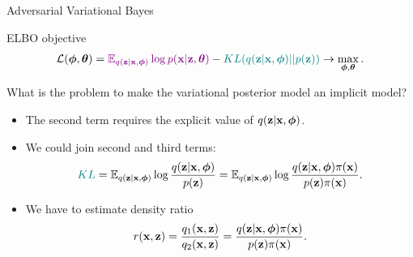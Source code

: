 \documentclass{beamer}
\begin{document}
\begin{frame}{Adversarial Variational Bayes}
	\begin{block}{ELBO objective}
		\vspace{-0.5cm}
		\[
			\mathcal{L} (\boldsymbol{\phi}, \boldsymbol{\theta})  = {\color{violet}\mathbb{E}_{q(\mathbf{z} | \mathbf{x}, \boldsymbol{\phi})} \log p(\mathbf{x} | \mathbf{z}, \boldsymbol{\theta})} - {\color{teal}KL(q(\mathbf{z}| \mathbf{x}, \boldsymbol{\phi}) || p(\mathbf{z}))} \rightarrow \max_{\boldsymbol{\phi}, \boldsymbol{\theta}}.
		\]	
		\vspace{-0.5cm}
	\end{block}
	What is the problem to make the variational posterior model an implicit model?
	\begin{itemize}
	\item {\color{teal}The second term} requires the explicit value of $q(\mathbf{z} | \mathbf{x}, \boldsymbol{\phi})$.
	\item We could join second and third terms:
		\vspace{-0.2cm}
		{\small
		\[
			{\color{teal}KL} = \mathbb{E}_{q(\mathbf{z} | \mathbf{x}, \boldsymbol{\phi})} \log \frac{q(\mathbf{z}| \mathbf{x}, \boldsymbol{\phi})}{p(\mathbf{z})} = \mathbb{E}_{q(\mathbf{z} | \mathbf{x}, \boldsymbol{\phi})} \log \frac{q(\mathbf{z}| \mathbf{x}, \boldsymbol{\phi}) \pi (\mathbf{x})}{p(\mathbf{z}) \pi(\mathbf{x})}.
		\]
		}
		\vspace{-0.5cm}
	\item We have to estimate density ratio 
		\vspace{-0.2cm}
		\[
			r(\mathbf{x}, \mathbf{z}) = \frac{q_1(\mathbf{x}, \mathbf{z})}{q_2(\mathbf{x}, \mathbf{z})} = \frac{q(\mathbf{z}| \mathbf{x}, \boldsymbol{\phi}) \pi (\mathbf{x})}{p(\mathbf{z}) \pi(\mathbf{x})}.
		\] 
	\end{itemize}
\end{frame}
\end{document}
